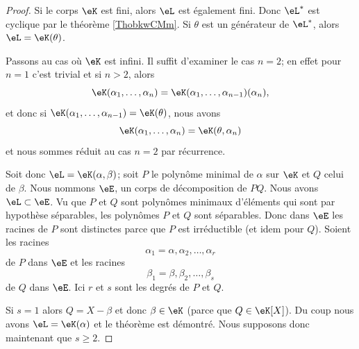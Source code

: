 \begin{proof}
    Si le corps \( \eK\) est fini, alors \( \eL\) est également fini. Donc \( \eL^*\) est cyclique par le théorème \ref{ThobkwCMm}. Si \( \theta\) est un générateur de \( \eL^*\), alors \( \eL=\eK(\theta)\).

    Passons au cas où \( \eK\) est infini. Il suffit d'examiner le cas \( n=2\); en effet pour \( n=1\) c'est trivial et si \( n>2\), alors
    \begin{equation}
        \eK(\alpha_1,\ldots, \alpha_n)=\eK(\alpha_1,\ldots, \alpha_{n-1})(\alpha_n),
    \end{equation}
    et donc si \( \eK(\alpha_1,\ldots, \alpha_{n-1})=\eK(\theta)\), nous avons
    \begin{equation}
        \eK(\alpha_1,\ldots, \alpha_n)=\eK(\theta,\alpha_n)
    \end{equation}
    et nous sommes réduit au cas \( n=2\) par récurrence. 

    Soit donc \( \eL=\eK(\alpha,\beta)\); soit \( P\) le polynôme minimal de \( \alpha\) sur \( \eK\) et \( Q\) celui de \( \beta\). Nous nommons \( \eE\), un corps de décomposition de \( PQ\). Nous avons \( \eL\subset \eE\). Vu que \( P\) et \( Q\) sont polynômes minimaux d'éléments qui sont par hypothèse séparables, les polynômes \( P\) et \( Q\) sont séparables. Donc dans \( \eE\) les racines de \( P\) sont distinctes parce que \( P\) est irréductible (et idem pour \( Q\)). Soient les racines
    \begin{equation}
        \alpha_1=\alpha,\alpha_2,\ldots, \alpha_r
    \end{equation}
    de \( P\) dans \( \eE\) et les racines
    \begin{equation}
        \beta_1=\beta,\beta_2,\ldots, \beta_s
    \end{equation}
    de \( Q\) dans \( \eE\). Ici \( r\) et \( s\) sont les degrés de \( P\) et \( Q\).

    Si \( s=1\) alors \( Q=X-\beta\) et donc \( \beta\in \eK\) (parce que \( Q\in \eK[X]\)). Du coup nous avons \( \eL=\eK(\alpha)\) et le théorème est démontré. Nous supposons donc maintenant que \( s\geq 2\).


\end{proof}
